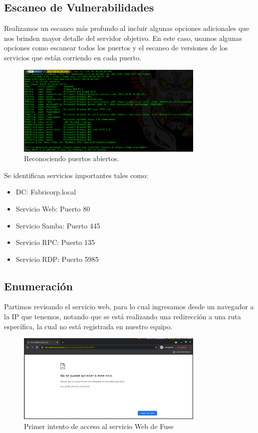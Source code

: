 \documentclass{article}
\begin{document}
\subsection{Escaneo de Vulnerabilidades}

Realizamos un escaneo más profundo al incluir algunas opciones adicionales que nos brinden mayor detalle del servidor objetivo. En este caso, usamos algunas opciones como escanear todos los puertos y el escaneo de versiones de los servicios que están corriendo en cada puerto.

\begin{figure}[h]
	\center
	\includegraphics[width=0.8\textwidth]{images/fuse/services.png}
	\caption{Reconociendo puertos abiertos.}
\end{figure}

Se identifican servicios importantes tales como:
\begin{itemize}
	\item DC: Fabricorp.local
	\item Servicio Web: Puerto 80
	\item Servicio Samba: Puerto 445
	\item Servicio RPC: Puerto 135
	\item Servicio RDP: Puerto 5985
\end{itemize}

\clearpage

\subsection{Enumeración}

Partimos revisando el servicio web, para lo cual ingresamos desde un navegador a la IP que tenemos, notando que se está realizando una redirección a una ruta específica, la cual no está registrada en nuestro equipo.
\begin{figure}[h]
	\center
	\includegraphics[width=0.8\textwidth]{images/fuse/image2.png}
	\caption{Primer intento de acceso al servicio Web de Fuse}
\end{figure}
\end{document}
